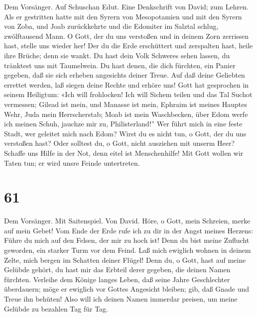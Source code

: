  Dem Vorsänger. Auf Schuschan Edut. Eine Denkschrift von
David; zum Lehren. Als er gestritten hatte mit den Syrern von
Mesopotamien und mit den Syrern von Zoba, und Joab zurückkehrte und die
Edomiter im Salztal schlug, zwölftausend Mann. O Gott, der du uns
verstoßen und in deinem Zorn zerrissen hast, stelle uns wieder her!
 Der du die Erde erschüttert und zerspalten hast, heile
ihre Brüche; denn sie wankt.  Du hast dein Volk Schweres
sehen lassen, du tränktest uns mit Taumelwein.  Du hast
denen, die dich fürchten, ein Panier gegeben, daß sie sich erheben
angesichts deiner Treue.  Auf daß deine Geliebten errettet
werden, laß siegen deine Rechte und erhöre uns!  Gott hat
gesprochen in seinem Heiligtum: «Ich will frohlocken! Ich will Sichem
teilen und das Tal Suchot vermessen;  Gilead ist mein, und
Manasse ist mein, Ephraim ist meines Hauptes Wehr, Juda mein
Herrscherstab;  Moab ist mein Waschbecken, über Edom werfe
ich meinen Schuh, jauchze mir zu, Philisterland!''  Wer
führt mich in eine feste Stadt, wer geleitet mich nach Edom?
 Wirst du es nicht tun, o Gott, der du uns verstoßen
hast? Oder solltest du, o Gott, nicht ausziehen mit unserm Heer?
 Schaffe uns Hilfe in der Not, denn eitel ist
Menschenhilfe!  Mit Gott wollen wir Taten tun; er wird
unsre Feinde untertreten.

\hypertarget{section-60}{%
\section{61}\label{section-60}}

 Dem Vorsänger. Mit Saitenspiel. Von David. Höre, o Gott,
mein Schreien, merke auf mein Gebet!  Vom Ende der Erde
rufe ich zu dir in der Angst meines Herzens: Führe du mich auf den
Felsen, der mir zu hoch ist!  Denn du bist meine Zuflucht
geworden, ein starker Turm vor dem Feind.  Laß mich
ewiglich wohnen in deinem Zelte, mich bergen im Schatten deiner Flügel!
 Denn du, o Gott, hast auf meine Gelübde gehört, du hast
mir das Erbteil derer gegeben, die deinen Namen fürchten. 
Verleihe dem Könige langes Leben, daß seine Jahre Geschlechter
überdauern;  möge er ewiglich vor Gottes Angesicht
bleiben; gib, daß Gnade und Treue ihn behüten!  Also will
ich deinen Namen immerdar preisen, um meine Gelübde zu bezahlen Tag für
Tag.

